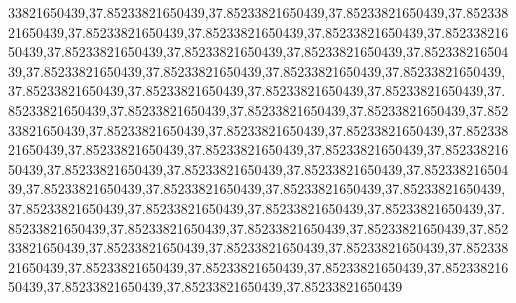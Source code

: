 33821650439,37.85233821650439,37.85233821650439,37.85233821650439,37.85233821650439,37.85233821650439,37.85233821650439,37.85233821650439,37.85233821650439,37.85233821650439,37.85233821650439,37.85233821650439,37.85233821650439,37.85233821650439,37.85233821650439,37.85233821650439,37.85233821650439,37.85233821650439,37.85233821650439,37.85233821650439,37.85233821650439,37.85233821650439,37.85233821650439,37.85233821650439,37.85233821650439,37.85233821650439,37.85233821650439,37.85233821650439,37.85233821650439,37.85233821650439,37.85233821650439,37.85233821650439,37.85233821650439,37.85233821650439,37.85233821650439,37.85233821650439,37.85233821650439,37.85233821650439,37.85233821650439,37.85233821650439,37.85233821650439,37.85233821650439,37.85233821650439,37.85233821650439,37.85233821650439,37.85233821650439,37.85233821650439,37.85233821650439,37.85233821650439,37.85233821650439,37.85233821650439,37.85233821650439,37.85233821650439,37.85233821650439,37.85233821650439,37.85233821650439,37.85233821650439,37.85233821650439,37.85233821650439,37.85233821650439,37.85233821650439,37.85233821650439

